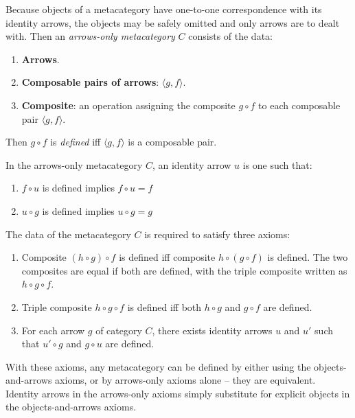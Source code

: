 \begin{definition}
    Because objects of a metacategory have one-to-one correspondence with its identity arrows, the objects may be safely omitted and only arrows are to dealt with. Then an \textit{arrows-only metacategory} $C$ consists of the data:
    \begin{enumerate}
        \item \textbf{Arrows}.
        \item \textbf{Composable pairs of arrows}: $\langle g, f \rangle$.
        \item \textbf{Composite}: an operation assigning the composite $g \circ f$ to each composable pair $\langle g, f \rangle$.
    \end{enumerate}
    
    Then $g \circ f$ is \textit{defined} iff $\langle g, f \rangle$ is a composable pair.
    
    In the arrows-only metacategory $C$, an identity arrow $u$ is one such that:
    \begin{enumerate}
        \item $f \circ u$ is defined implies $f \circ u = f$
        \item $u \circ g$ is defined implies $u \circ g = g$
    \end{enumerate}
    
    The data of the metacategory $C$ is required to satisfy three axioms:
    \begin{enumerate}
        \item Composite $(h \circ g) \circ f$ is defined iff composite $h \circ (g \circ f)$ is defined. The two composites are equal if both are defined, with the triple composite written as $h \circ g \circ f$.
        \item Triple composite $h \circ g \circ f$ is defined iff both $h \circ g$ and $g \circ f$ are defined.
        \item For each arrow $g$ of category $C$, there exists identity arrows $u$ and $u'$ such that $u' \circ g$ and $g \circ u$ are defined.
    \end{enumerate}
\end{definition}

\begin{remark}
    With these axioms, any metacategory can be defined by either using the objects-and-arrows axioms, or by arrows-only axioms alone -- they are equivalent. Identity arrows in the arrows-only axioms simply substitute for explicit objects in the objects-and-arrows axioms.
\end{remark}
